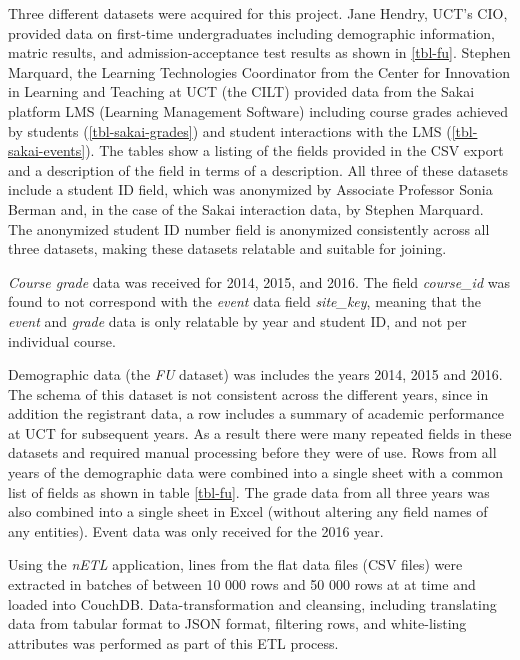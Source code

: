 Three different datasets were acquired for this project. Jane Hendry, UCT's CIO, provided data on first-time undergraduates including demographic information, matric results, and admission-acceptance test results as shown in \ref{tbl-fu}. Stephen Marquard, the Learning Technologies Coordinator from the Center for Innovation in Learning and Teaching at UCT (the CILT) provided data from the Sakai platform LMS (Learning Management Software) including course grades achieved by students (\ref{tbl-sakai-grades}) and student interactions with the LMS (\ref{tbl-sakai-events}). The tables show a listing of the fields provided in the CSV export and a description of the field in terms of a description. All three of these datasets include a student ID field, which was anonymized by Associate Professor Sonia Berman and, in the case of the Sakai interaction data, by Stephen Marquard. The anonymized student ID number field is anonymized consistently across all three datasets, making these datasets relatable and suitable for joining.

\textit{Course grade} data was received for 2014, 2015, and 2016. The field \textit{course\_id} was found to not correspond with the \textit{event} data field \textit{site\_key}, meaning that the \textit{event} and \textit{grade} data is only relatable by year and student ID, and not per individual course.

Demographic data (the \textit{FU} dataset) was includes the years 2014, 2015 and 2016. The schema of this dataset is not consistent across the different years, since in addition the registrant data, a row includes a summary of academic performance at UCT for subsequent years. As a result there were many repeated fields in these datasets and required manual processing before they were of use. Rows from all years of the demographic data were combined into a single sheet with a common list of fields as shown in table \ref{tbl-fu}. The grade data from all three years was also combined into a single sheet in Excel (without altering any field names of any entities). Event data was only received for the 2016 year.

Using the \textit{nETL} application, lines from the flat data files (CSV files) were extracted in batches of between 10 000 rows and 50 000 rows at at time and loaded into CouchDB. Data-transformation and cleansing, including translating data from tabular format to JSON format, filtering rows, and white-listing attributes was performed as part of this ETL process.

